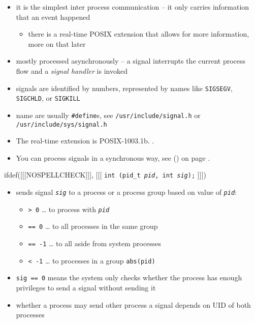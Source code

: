 
\begin{slide}
\begin{itemize}
\item it is the simplest inter process communication -- it only carries
information that an event happened
\begin{itemize}
\item there is a real-time POSIX extension that allows for more information,
more on that later
\end{itemize}
\item mostly processed asynchronously -- a signal interrupts the current process
flow and a \emph{signal handler} is invoked
\item signals are identified by numbers, represented by names like
\texttt{SIGSEGV}, \texttt{SIGCHLD}, or \texttt{SIGKILL}
\item name are usually \texttt{\#define}s, see \texttt{/usr/include/signal.h} or
\texttt{/usr/include/sys/signal.h}
\end{itemize}
\end{slide}

\begin{itemize}
\item The real-time extension is POSIX-1003.1b.
\pageref{REALTIMEEXTENSIONS}.
\item You can process signals in a synchronous way, see () on
page \pageref{SIGWAIT}.
\end{itemize}



\begin{slide}
ifdef([[[NOSPELLCHECK]]], [[[
\texttt{int (pid\_t \emph{pid}, int \emph{sig});}
]]])
\begin{itemize}
\item sends signal \emph{\texttt{sig}} to a process or a process group
based on value of \emph{\texttt{pid}}: 
    \begin{itemize}
    \item \texttt{> 0} \dots{} to process with \emph{\texttt{pid}}
    \item \texttt{== 0} \dots{} to all processes in the same group
    \item \texttt{== -1} \dots{} to all aside from system processes
    \item \texttt{< -1} \dots{} to processes in a group \texttt{abs(pid)} 
    \end{itemize}
\item \texttt{sig == 0} means the system only checks whether the process has
enough privileges to send a signal without sending it
\item whether a process may send other process a signal depends on UID of both
processes
\end{itemize}
\end{slide}

